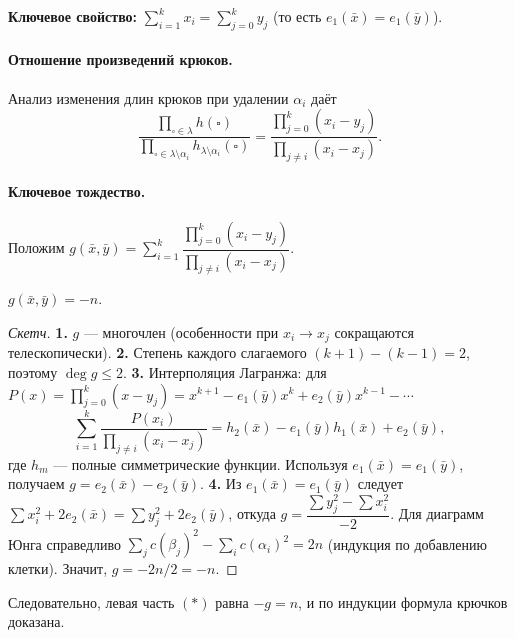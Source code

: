 \textbf{Ключевое свойство:} $\sum_{i=1}^k x_i=\sum_{j=0}^k y_j$ (то есть $e_1(\bar x)=e_1(\bar y)$).

\paragraph{Отношение произведений крюков.}
Анализ изменения длин крюков при удалении $\alpha_i$ даёт
\[
\frac{\prod_{\square\in\lambda}h(\square)}{\prod_{\square\in\lambda\setminus\alpha_i}h_{\lambda\setminus\alpha_i}(\square)}
=\frac{\prod_{j=0}^{k}(x_i-y_j)}{\prod_{j\neq i}(x_i-x_j)}.
\]

\paragraph{Ключевое тождество.}
Положим $g(\bar x,\bar y)=\sum_{i=1}^{k}\dfrac{\prod_{j=0}^{k}(x_i-y_j)}{\prod_{j\neq i}(x_i-x_j)}$.

\begin{Statement}{}{}
	$g(\bar x,\bar y)=-n$.
\end{Statement}

\begin{proof}[Скетч]
	\textbf{1.} $g$ — многочлен (особенности при $x_i\to x_j$ сокращаются телескопически). \textbf{2.} Степень каждого слагаемого $(k+1)-(k-1)=2$, поэтому $\deg g\le 2$. \textbf{3.} Интерполяция Лагранжа: для $P(x)=\prod_{j=0}^k(x-y_j)=x^{k+1}-e_1(\bar y)x^k+e_2(\bar y)x^{k-1}-\cdots$
	\[
	\sum_{i=1}^k\frac{P(x_i)}{\prod_{j\neq i}(x_i-x_j)}=h_2(\bar x)-e_1(\bar y)h_1(\bar x)+e_2(\bar y),
	\]
	где $h_m$ — полные симметрические функции. Используя $e_1(\bar x)=e_1(\bar y)$, получаем $g=e_2(\bar x)-e_2(\bar y)$. \textbf{4.} Из $e_1(\bar x)=e_1(\bar y)$ следует $\sum x_i^2+2e_2(\bar x)=\sum y_j^2+2e_2(\bar y)$, откуда $g=\dfrac{\sum y_j^2-\sum x_i^2}{-2}$. Для диаграмм Юнга справедливо $\sum_j c(\beta_j)^2-\sum_i c(\alpha_i)^2=2n$ (индукция по добавлению клетки). Значит, $g=-2n/2=-n$.
\end{proof}

Следовательно, левая часть $(*)$ равна $-g=n$, и по индукции формула крючков доказана.
